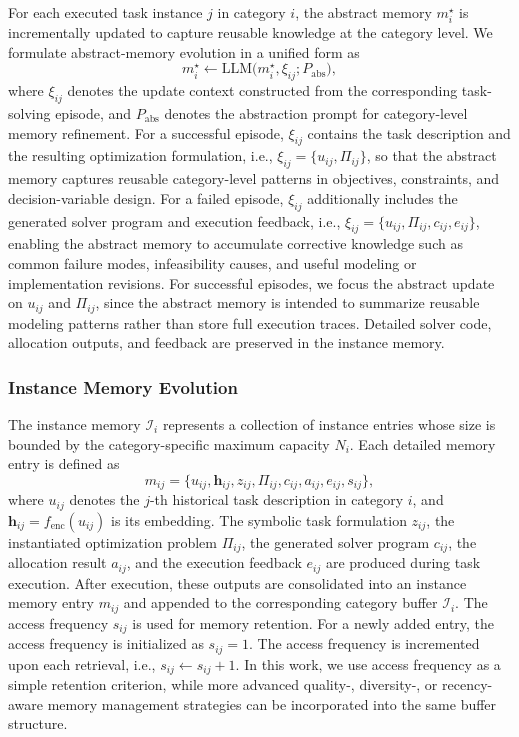 \documentclass[letterpaper,journal]{IEEEtran}
\begin{document}
For each executed task instance \(j\) in category \(i\), the abstract memory \(m_i^{\star}\) is incrementally updated to capture reusable knowledge at the category level. We formulate abstract-memory evolution in a unified form as
\begin{equation}
m_i^{\star} \leftarrow \mathrm{LLM}\bigl(m_i^{\star} , \xi_{ij}; P_{\mathrm{abs}}\bigr),
\end{equation}
where \(\xi_{ij}\) denotes the update context constructed from the corresponding task-solving episode, and \(P_{\mathrm{abs}}\) denotes the abstraction prompt for category-level memory refinement. For a successful episode, \(\xi_{ij}\) contains the task description and the resulting optimization formulation, i.e., \(\xi_{ij}=\{u_{ij},\Pi_{ij}\}\), so that the abstract memory captures reusable category-level patterns in objectives, constraints, and decision-variable design. For a failed episode, \(\xi_{ij}\) additionally includes the generated solver program and execution feedback, i.e., \(\xi_{ij}=\{u_{ij},\Pi_{ij},c_{ij},e_{ij}\}\), enabling the abstract memory to accumulate corrective knowledge such as common failure modes, infeasibility causes, and useful modeling or implementation revisions. For successful episodes, we focus the abstract update on \(u_{ij}\) and \(\Pi_{ij}\), since the abstract memory is intended to summarize reusable modeling patterns rather than store full execution traces. Detailed solver code, allocation outputs, and feedback are preserved in the instance memory.



\subsubsection{Instance Memory Evolution}

The instance memory $\mathcal{I}_i$ represents a collection of instance entries whose size is bounded by the category-specific maximum capacity $N_i$. Each detailed memory entry is defined as
\begin{equation}
m_{ij} = \{ u_{ij}, \mathbf{h}_{ij}, z_{ij}, \Pi_{ij}, c_{ij}, a_{ij}, e_{ij}, s_{ij} \},
\end{equation}
where \(u_{ij}\) denotes the \(j\)-th historical task description in category \(i\), and \(\mathbf{h}_{ij}=f_{\mathrm{enc}}(u_{ij})\) is its embedding.
The symbolic task formulation \(z_{ij}\), the instantiated optimization problem \(\Pi_{ij}\), the generated solver program \(c_{ij}\), the allocation result \(a_{ij}\), and the execution feedback \(e_{ij}\) are produced during task execution. After execution, these outputs are consolidated into an instance memory entry \(m_{ij}\) and appended to the corresponding category buffer \(\mathcal{I}_i\). The access frequency \(s_{ij}\) is used for memory retention. For a newly added entry, the access frequency is initialized as \(s_{ij}=1\). The access frequency is incremented upon each retrieval, i.e., \(s_{ij} \leftarrow s_{ij} + 1\). In this work, we use access frequency as a simple retention criterion, while more advanced quality-, diversity-, or recency-aware memory management strategies can be incorporated into the same buffer structure.
\end{document}
